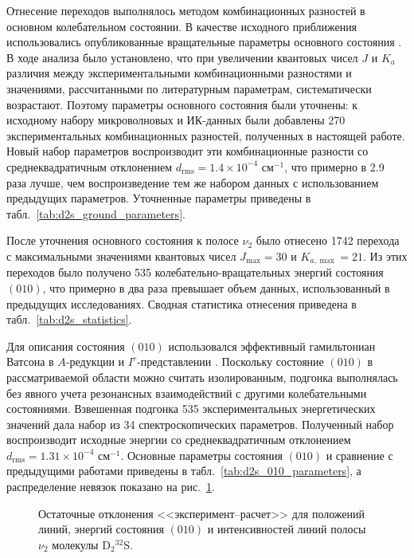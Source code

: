 Отнесение переходов выполнялось методом комбинационных разностей в основном колебательном состоянии.
В качестве исходного приближения использовались опубликованные вращательные параметры основного
состояния \cite{d2s_camy1985}. В ходе анализа было установлено, что при увеличении квантовых чисел
$J$ и $K_a$ различия между экспериментальными комбинационными разностями и значениями, рассчитанными
по литературным параметрам, систематически возрастают. Поэтому параметры основного состояния были
уточнены: к исходному набору микроволновых и ИК-данных были добавлены 270 экспериментальных
комбинационных разностей, полученных в настоящей работе. Новый набор параметров воспроизводит эти
комбинационные разности со среднеквадратичным отклонением $d_{\textrm{rms}}=1.4\times10^{-4}$
см$^{-1}$, что примерно в 2.9 раза лучше, чем воспроизведение тем же набором данных с использованием
предыдущих параметров. Уточненные параметры приведены в табл.~\ref{tab:d2s_ground_parameters}.



После уточнения основного состояния к полосе $\nu_2$ было отнесено 1742 перехода с максимальными
значениями квантовых чисел $J_{\max}=30$ и $K_{a,\max}=21$. Из этих переходов было получено 535
колебательно-вращательных энергий состояния $(010)$, что примерно в два раза превышает объем данных,
использованный в предыдущих исследованиях. Сводная статистика отнесения приведена в
табл.~\ref{tab:d2s_statistics}.



Для описания состояния $(010)$ использовался эффективный гамильтониан Ватсона в $A$-редукции и
$I^r$-представлении \cite{0102}. Поскольку состояние $(010)$ в рассматриваемой области можно считать
изолированным, подгонка выполнялась без явного учета резонансных взаимодействий с другими
колебательными состояниями. Взвешенная подгонка 535 экспериментальных энергетических значений дала
набор из 34 спектроскопических параметров. Полученный набор воспроизводит исходные энергии со
среднеквадратичным отклонением $d_{\textrm{rms}}=1.31\times10^{-4}$ см$^{-1}$. Основные параметры
состояния $(010)$ и сравнение с предыдущими работами приведены в
табл.~\ref{tab:d2s_010_parameters}, а распределение невязок показано на рис.~\ref{fig:d2s_residuals}.



\begin{figure}[htbp]
    \centering
    \caption{Остаточные отклонения <<эксперимент--расчет>> для положений линий, энергий состояния
    $(010)$ и интенсивностей линий полосы $\nu_2$ молекулы D$_2{}^{32}$S.}
    \label{fig:d2s_residuals}
\end{figure}

